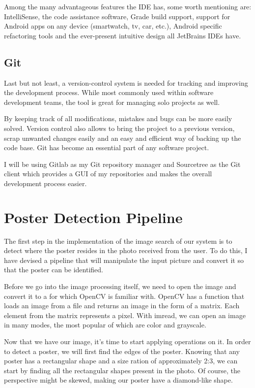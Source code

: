 \documentclass[12pt,a4paper,twoside]{report}
\begin{document}
Among the many advantageous features the IDE has, some worth mentioning are: IntelliSense, the code assistance software, Grade build support, support for Android apps on any device (smartwatch, tv, car, etc.), Android specific refactoring tools and the ever-present intuitive design all JetBrains IDEs have.

\subsection{Git}
Last but not least, a version-control system is needed for tracking and improving the development process. While most commonly used within software development teams, the tool is great for managing solo projects as well. 

By keeping track of all modifications, mistakes and bugs can be more easily solved. Version control also allows to bring the project to a previous version, scrap unwanted changes easily and an easy and efficient way of backing up the code base. Git has become an essential part of any software project.

I will be using Gitlab as my Git repository manager and Sourcetree as the Git client which provides a GUI of my repositories and makes the overall development process easier.


\section{Poster Detection Pipeline}
The first step in the implementation of the image search of our system is to detect where the poster resides in the photo received from the user. To do this, I have devised a pipeline that will manipulate the input picture and convert it so that the poster can be identified.

Before we go into the image processing itself, we need to open the image and convert it to a for which OpenCV is familiar with. OpenCV has a function that loads an image from a file and returns an image in the form of a matrix. Each element from the matrix represents a pixel. With imread, we can open an image in many modes, the most popular of which are color and grayscale.

Now that we have our image, it's time to start applying operations on it. In order to detect a poster, we will first find the edges of the poster. Knowing that any poster has a rectangular shape and a size ration of approximately 2:3, we can start by finding all the rectangular shapes present in the photo. Of course, the perspective might be skewed, making our poster have a diamond-like shape. 
\end{document}
